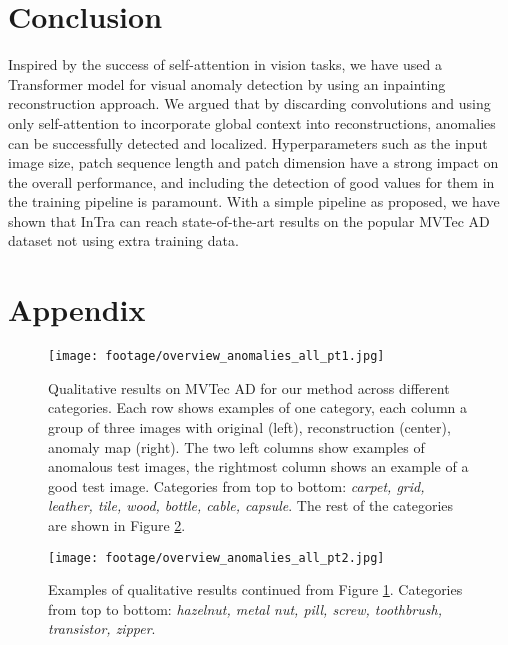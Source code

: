 \documentclass[runningheads]{llncs}
\begin{document}
\section{Conclusion}
\begin{samepage}
Inspired by the success of self-attention in vision tasks, we have used a Transformer model for visual anomaly detection by using an inpainting reconstruction approach. We argued that by discarding convolutions and using only self-attention to incorporate global context into reconstructions, anomalies can be successfully detected and localized. Hyperparameters such as the input image size, patch sequence length and patch dimension have a strong impact on the overall performance, and including the detection of good values for them in the training pipeline is paramount. With a simple pipeline as proposed, we have shown that InTra can reach state-of-the-art results on the popular MVTec AD dataset not using extra training data.
\end{samepage}




\newpage
\appendix

\section{Appendix}

\begin{figure}[ht]
	\centering
	\texttt{[image: footage/overview\_anomalies\_all\_pt1.jpg]}
	\caption{Qualitative results on MVTec AD for our method across different categories. Each row shows examples of one category, each column a group of three images with original (left), reconstruction (center), anomaly map (right). The two left columns show examples of anomalous test images, the rightmost column shows an example of a good test image. Categories from top to bottom: \textit{carpet, grid, leather, tile, wood, bottle, cable, capsule}. The rest of the categories are shown in Figure \ref{fig:overview_anomalies_all_pt2}.}
	\label{fig:overview_anomalies_all_pt1}
\end{figure}

\begin{figure}[ht]
	\centering
	\texttt{[image: footage/overview\_anomalies\_all\_pt2.jpg]}
	\caption{Examples of qualitative results continued from Figure \ref{fig:overview_anomalies_all_pt1}. Categories from top to bottom: \textit{hazelnut, metal nut, pill, screw, toothbrush, transistor, zipper}.}
	\label{fig:overview_anomalies_all_pt2}
\end{figure}
\end{document}
